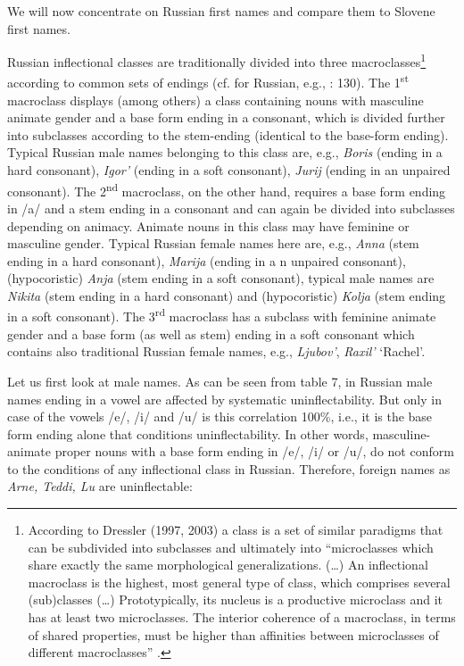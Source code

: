 \documentclass[output=paper]{langscibook}
\begin{document}
We will now concentrate on Russian first names and compare them to Slovene first names.

Russian inflectional classes are traditionally divided into three macroclasses\footnote{ \textrm{According to Dressler (1997, 2003) a class is a set of similar paradigms that can be subdivided into subclasses and ultimately into “microclasses which share exactly the same morphological generalizations. (…) An inflectional macroclass is the highest, most general type of class, which comprises several (sub)classes (…) Prototypically, its nucleus is a productive microclass and it has at least two microclasses. The interior coherence of a macroclass, in terms of shared properties, must be higher than affinities between microclasses of different macroclasses” \citep[35-36]{Dressler2003}.}} according to common sets of endings (cf. for Russian, e.g., \citealt{Timberlake2004}: 130). The 1\textsuperscript{st} macroclass displays (among others) a class containing nouns with masculine animate gender and a base form ending in a consonant, which is divided further into subclasses according to the stem-ending (identical to the base-form ending). Typical Russian male names belonging to this class are, e.g., \textit{Boris} (ending in a hard consonant), \textit{Igor’} (ending in a soft consonant), \textit{Jurij} (ending in an unpaired consonant). The 2\textsuperscript{nd} macroclass, on the other hand, requires a base form ending in /a/ and a stem ending in a consonant and can again be divided into subclasses depending on animacy. Animate nouns in this class may have feminine or masculine gender. Typical Russian female names here are, e.g., \textit{Anna} (stem ending in a hard consonant), \textit{Marija} (ending in a n unpaired consonant), (hypocoristic) \textit{Anja} (stem ending in a soft consonant), typical male names are \textit{Nikita} (stem ending in a hard consonant) and (hypocoristic) \textit{Kolja} (stem ending in a soft consonant). The 3\textsuperscript{rd} macroclass has a subclass with feminine animate gender and a base form (as well as stem) ending in a soft consonant which contains also traditional Russian female names, e.g., \textit{Ljubov’}, \textit{Raxil’} ‘Rachel’.

Let us first look at male names. As can be seen from table 7, in Russian male names ending in a vowel are affected by systematic uninflectability. But only in case of the vowels /e/, /i/ and /u/ is this correlation 100\%, i.e., it is the base form ending alone that conditions uninflectability. In other words, masculine-animate proper nouns with a base form ending in /e/, /i/ or /u/, do not conform to the conditions of any inflectional class in Russian. Therefore, foreign names as \textit{Arne, Teddi, Lu} are uninflectable: 
\end{document}
